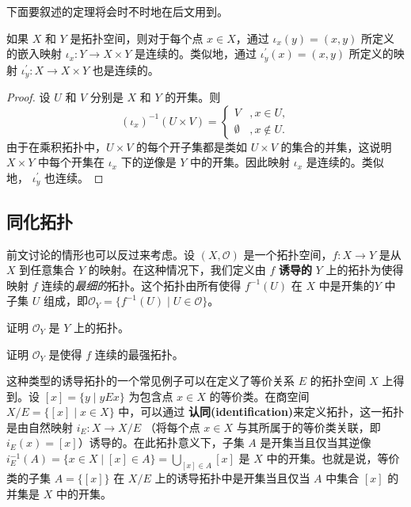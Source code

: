 下面要叙述的定理将会时不时地在后文用到。

\begin{theorem}\label{thm:10.3}
	如果 $X$ 和 $Y$ 是拓扑空间，则对于每个点 $x\in X$，通过 $\iota _{x} (y)=(x,y)$ 所定义的嵌入映射 $\iota _{x} :Y\rightarrow X\times Y$  是连续的。类似地，通过 $\iota ^{\prime}_{y} (x)=(x,y)$ 所定义的映射 $\iota ^{\prime}_{y} :X\rightarrow X\times Y$  也是连续的。
\end{theorem}

\begin{proof}
	设 $U$ 和 $V$ 分别是 $X$ 和 $Y$ 的开集。则
\begin{equation*}
( \iota _{x})^{-1} (U\times V)=\begin{cases}
V & ,x\in U,\\
\emptyset  & ,x\notin U.
\end{cases}
\end{equation*}
由于在乘积拓扑中，$U\times V$ 的每个开子集都是类如 $U\times V$ 的集合的并集，这说明 $X\times Y$ 中每个开集在 $\iota _{x}$ 下的逆像是 $Y$ 中的开集。因此映射 $\iota _{x}$ 是连续的。类似地， $\iota ^{\prime}_{y}$ 也连续。
\end{proof}	

\subsection{同化拓扑}

	前文讨论的情形也可以反过来考虑。设 $(X,\mathcal{O} )$ 是一个拓扑空间，$f:X\rightarrow Y$ 是从 $X$ 到任意集合 $Y$ 的映射。在这种情况下，我们定义由 $f$ \textbf{诱导的} $Y$ 上的拓扑为使得映射 $f$ 连续的\emph{最细的}拓扑。这个拓扑由所有使得 $f^{-1} (U)$ 在 $X$ 中是开集的$Y$ 中子集 $U$ 组成，即$\mathcal{O}_{Y} =\{f^{-1} (U)\mid U\in \mathcal{O} \}$。

\begin{exercise}
	证明 $\mathcal{O}_{Y}$ 是 $Y$ 上的拓扑。
\end{exercise}

\begin{exercise}
	证明 $\mathcal{O}_{Y}$ 是使得 $f$ 连续的最强拓扑。
\end{exercise}

	这种类型的诱导拓扑的一个常见例子可以在定义了等价关系 $E$ 的拓扑空间 $X$ 上得到。设 $[x]=\{y\mid yEx\}$ 为包含点 $x\in X$ 的等价类。在商空间 $X/E=\{[x]\mid x\in X\}$ 中，可以通过 \textbf{认同(identification)}来定义拓扑，这一拓扑是由自然映射 $i_{E} :X\rightarrow X/E$ （将每个点 $x\in X$ 与其所属于的等价类关联，即 $i_{E} (x)=[x]$）诱导的。在此拓扑意义下，子集 $A$ 是开集当且仅当其逆像 $i_{E}^{-1} (A)=\{x\in X\mid [x]\in A\}=\bigcup _{[ x] \in A}[ x]$ 是 $X$ 中的开集。也就是说，等价类的子集 $A=\{[x]\}$ 在 $X/E$ 上的诱导拓扑中是开集当且仅当 $A$ 中集合 $[x]$ 的并集是 $X$ 中的开集。

